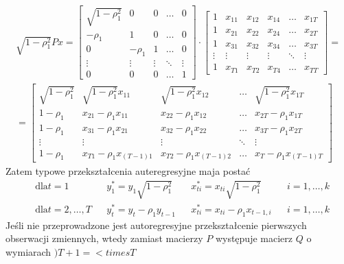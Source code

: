 \begin{gather*}
\sqrt{1-\rho_1^2}Px=
\begin{bmatrix}
	\sqrt{1-\rho_1^2} & 0        & 0      & \ldots & 0      \\
	-\rho _1          & 1        & 0      & \ldots & 0      \\
	0                 & -\rho _1 & 1      & \ldots & 0      \\
	\vdots            & \vdots   & \vdots & \ddots & \vdots \\
	0                 & 0        & 0      & \ldots & 1
\end{bmatrix}
\cdot
\begin{bmatrix}
	  1    & x_{11} & x_{12} & x_{14} & \ldots & x_{1T} \\
	  1    & x_{21} & x_{22} & x_{24} & \ldots & x_{2T} \\
	  1    & x_{31} & x_{32} & x_{34} & \ldots & x_{3T} \\
	\vdots & \vdots & \vdots & \vdots & \ddots & \vdots \\
	  1    & x_{T1} & x_{T2} & x_{T4} & \ldots & x_{TT}
\end{bmatrix}
=\\=
\begin{bmatrix}
	\sqrt{1-\rho _1^2} & \sqrt{1-\rho _1^2} x_{11} & \sqrt{1-\rho _1^2} x_{12} & \ldots & \sqrt{1-\rho _1^2} x_{1T} \\
	1-\rho _1          & x_{21}-\rho _1 x_{11}     & x_{22}-\rho _1 x_{12}     & \ldots & x_{2T}-\rho _1 x_{1T}     \\
	1-\rho _1          & x_{31}-\rho _1 x_{21}     & x_{32}-\rho _1 x_{22}     & \ldots & x_{3T}-\rho _1 x_{2T}     \\
	\vdots             & \vdots                    & \vdots                    & \ddots & \vdots                    \\
	1-\rho _1          & x_{T1}-\rho _1 x_{(T-1)1} & x_{T2}-\rho _1 x_{(T-1)2} & \ldots & x_{T}-\rho _1 x_{(T-1)T}
\end{bmatrix}
\end{gather*}
Zatem typowe przekształcenia auteregresyjne maja postać
\begin{align*}
	 & \text{dla}t=1         &  & y_1^*=y_1\sqrt{1-\rho_1^2} &  & x_{ti}^*=x_{ti}\sqrt{1-\rho_1^2} &  & i=1,\dots,k \\
	 & \text{dla}t=2,\dots,T &  & y_t^*=y_t-\rho_1y_{t-1}    &  & x_{ti}^*=x_{ti}-\rho_1 x_{t-1,i} &  & i=1,\dots,k
\end{align*}
Jeśli nie przeprowadzone jest autoregresyjne przekształcenie pierwszych obserwacji zmiennych, wtedy zamiast macierzy $ P $ występuje macierz $ Q $ o wymiarach $ )T+1=<times T $
